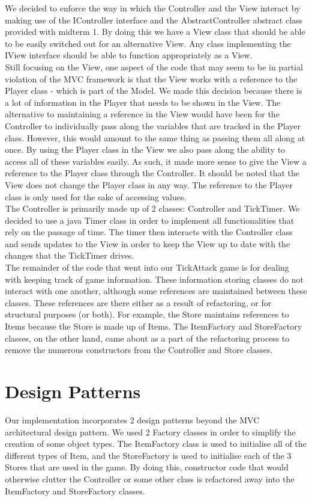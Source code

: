 \documentclass[letter paper, 12pt]{article}
\newcommand{\tab}{${}_{}$\hspace{0.2in}}
\begin{document}
We decided to enforce the way in which the Controller and the View interact by making use of the IController interface and the AbstractController abstract class provided with midterm 1. By doing this we have a View class that should be able to be easily switched out for an alternative View. Any class implementing the IView interface should be able to function appropriately as a View.\\
\tab Still focusing on the View, one aspect of the code that may seem to be in partial violation of the MVC framework is that the View works with a reference to the Player class - which is part of the Model. We made this decision because there is a lot of information in the Player that needs to be shown in the View. The alternative to maintaining a reference in the View would have been for the Controller to individually pass along the variables that are tracked in the Player class. However, this would amount to the same thing as passing them all along at once. By using the Player class in the View we also pass along the ability to access all of these variables easily. As such, it made more sense to give the View a reference to the Player class through the Controller. It should be noted that the View does not change the Player class in any way. The reference to the Player class is only used for the sake of accessing values.\\
\tab The Controller is primarily made up of 2 classes: Controller and TickTimer. We decided to use a java Timer class in order to implement all functionalities that rely on the passage of time. The timer then interacts with the Controller class and sends updates to the View in order to keep the View up to date with the changes that the TickTimer drives.\\
\tab The remainder of the code that went into our TickAttack game is for dealing with keeping track of game information. These information storing classes do not interact with one another, although some references are maintained between these classes. These references are there either as a result of refactoring, or for structural purposes (or both). For example, the Store maintains references to Items because the Store is made up of Items. The ItemFactory and StoreFactory classes, on the other hand, came about as a part of the refactoring process to remove the numerous constructors from the Controller and Store classes.

\section{Design Patterns}\label{sec:patterns}
Our implementation incorporates 2 design patterns beyond the MVC architectural design pattern. We used 2 Factory classes in order to simplify the creation of some object types. The ItemFactory class is used to initialise all of the different types of Item, and the StoreFactory is used to initialise each of the 3 Stores that are used in the game. By doing this, constructor code that would otherwise clutter the Controller or some other class is refactored away into the ItemFactory and StoreFactory classes.
\end{document}
